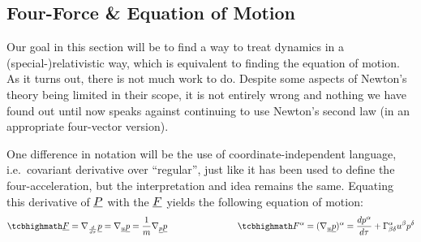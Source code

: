 \documentclass[../relativity_main.tex]{subfiles}
\begin{document}



		\subsection{Four-Force \& Equation of Motion}
Our goal in this section will be to find a way to treat dynamics in a (special-)relativistic way, which is equivalent to finding the equation of motion. As it turns out, there is not much work to do. Despite some aspects of Newton's theory being limited in their scope, it is not entirely wrong and nothing we have found out until now speaks against continuing to use Newton's second law (in an appropriate four-vector version).

One difference in notation will be the use of coordinate-independent language, i.e.~covariant derivative over \enquote{regular}, just like it has been used to define the four-acceleration, but the interpretation and idea remains the same. Equating this derivative of $\underline{P}$ with the  $\underline{F}$ yields the following equation of motion:
\begin{equation}\label{eq:eq_of_motion}
	\eqbox{
	\fvec{F} = \nabla_{\dv{\tau}} \fvec{p} = \nabla_{\fvec{u}} \fvec{p} = \frac{1}{m} \nabla_{\fvec{p}} \fvec{p}
	}
	\manyqquad
	\eqbox{
	F^\alpha = (\nabla_{\fvec{u}} \fvec{p})^\alpha = \dv{p^\alpha}{\tau} + \Gamma^\alpha_{\beta \delta} u^\beta p^\delta
	}
\end{equation}
\end{document}
